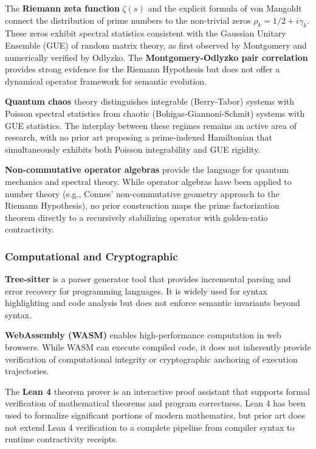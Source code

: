 \documentclass[12pt]{article}
\theoremstyle{plain}
\theoremstyle{definition}
\theoremstyle{remark}
\begin{document}
The \textbf{Riemann zeta function} $\zeta(s)$ and the explicit formula of von Mangoldt connect the distribution of prime numbers to the non-trivial zeros $\rho_k = 1/2 + i\gamma_k$. These zeros exhibit spectral statistics consistent with the Gaussian Unitary Ensemble (GUE) of random matrix theory, as first observed by Montgomery and numerically verified by Odlyzko. The \textbf{Montgomery-Odlyzko pair correlation} provides strong evidence for the Riemann Hypothesis but does not offer a dynamical operator framework for semantic evolution.

\textbf{Quantum chaos} theory distinguishes integrable (Berry-Tabor) systems with Poisson spectral statistics from chaotic (Bohigas-Giannoni-Schmit) systems with GUE statistics. The interplay between these regimes remains an active area of research, with no prior art proposing a prime-indexed Hamiltonian that simultaneously exhibits both Poisson integrability and GUE rigidity.

\textbf{Non-commutative operator algebras} provide the language for quantum mechanics and spectral theory. While operator algebras have been applied to number theory (e.g., Connes' non-commutative geometry approach to the Riemann Hypothesis), no prior construction maps the prime factorization theorem directly to a recursively stabilizing operator with golden-ratio contractivity.

\subsubsection{Computational and Cryptographic}

\textbf{Tree-sitter} is a parser generator tool that provides incremental parsing and error recovery for programming languages. It is widely used for syntax highlighting and code analysis but does not enforce semantic invariants beyond syntax.

\textbf{WebAssembly (WASM)} enables high-performance computation in web browsers. While WASM can execute compiled code, it does not inherently provide verification of computational integrity or cryptographic anchoring of execution trajectories.

The \textbf{Lean 4} theorem prover is an interactive proof assistant that supports formal verification of mathematical theorems and program correctness. Lean 4 has been used to formalize significant portions of modern mathematics, but prior art does not extend Lean 4 verification to a complete pipeline from compiler syntax to runtime contractivity receipts.
\end{document}
